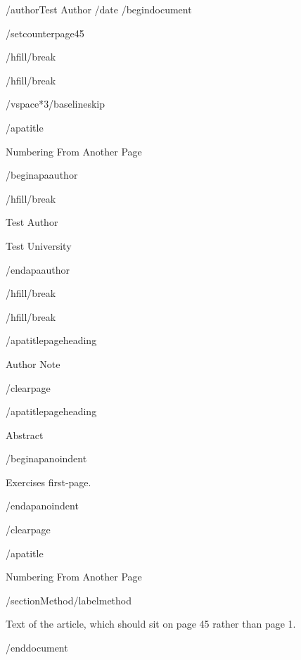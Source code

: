 /author{Test Author}
/date{}
/begin{document}


/setcounter{page}{45}

/hfill/break

/hfill/break

/vspace*{3/baselineskip}

/apatitle{

Numbering From Another Page

}

/begin{apaauthor}

/hfill/break

Test Author

Test University

/end{apaauthor}

/hfill/break

/hfill/break

/apatitlepageheading{

Author Note

}

/clearpage

/apatitlepageheading{

Abstract

}

/begin{apanoindent}

Exercises first-page.

/end{apanoindent}

/clearpage

/apatitle{

Numbering From Another Page

}

/section{Method}/label{method}

Text of the article, which should sit on page 45 rather than page 1.




/end{document}
